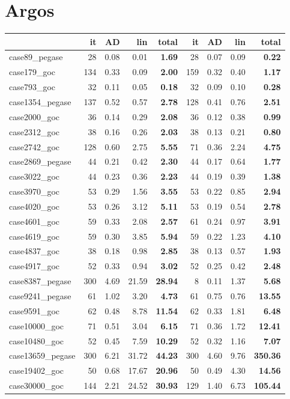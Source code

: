 
\section{Argos}

\begin{tabular}{|l|rrr >{\bfseries}r|rrr >{\bfseries}r|}
\hline
 & it & AD & lin & total & it & AD & lin & total \\
\hline
case89\_pegase & 28 & 0.08 & 0.01 & 1.69 & 28 & 0.07 & 0.09 & 0.22 \\
case179\_goc & 134 & 0.33 & 0.09 & 2.00 & 159 & 0.32 & 0.40 & 1.17 \\
case793\_goc & 32 & 0.11 & 0.05 & 0.18 & 32 & 0.09 & 0.10 & 0.28 \\
case1354\_pegase & 137 & 0.52 & 0.57 & 2.78 & 128 & 0.41 & 0.76 & 2.51 \\
case2000\_goc & 36 & 0.14 & 0.29 & 2.08 & 36 & 0.12 & 0.38 & 0.99 \\
case2312\_goc & 38 & 0.16 & 0.26 & 2.03 & 38 & 0.13 & 0.21 & 0.80 \\
case2742\_goc & 128 & 0.60 & 2.75 & 5.55 & 71 & 0.36 & 2.24 & 4.75 \\
case2869\_pegase & 44 & 0.21 & 0.42 & 2.30 & 44 & 0.17 & 0.64 & 1.77 \\
case3022\_goc & 44 & 0.23 & 0.36 & 2.23 & 44 & 0.19 & 0.39 & 1.38 \\
case3970\_goc & 53 & 0.29 & 1.56 & 3.55 & 53 & 0.22 & 0.85 & 2.94 \\
case4020\_goc & 53 & 0.26 & 3.12 & 5.11 & 53 & 0.19 & 0.54 & 2.78 \\
case4601\_goc & 59 & 0.33 & 2.08 & 2.57 & 61 & 0.24 & 0.97 & 3.91 \\
case4619\_goc & 59 & 0.30 & 3.85 & 5.94 & 59 & 0.22 & 1.23 & 4.10 \\
case4837\_goc & 38 & 0.18 & 0.98 & 2.85 & 38 & 0.13 & 0.57 & 1.93 \\
case4917\_goc & 52 & 0.33 & 0.94 & 3.02 & 52 & 0.25 & 0.42 & 2.48 \\
case8387\_pegase & 300 & 4.69 & 21.59 & 28.94 & 8 & 0.11 & 1.37 & 5.68 \\
case9241\_pegase & 61 & 1.02 & 3.20 & 4.73 & 61 & 0.75 & 0.76 & 13.55 \\
case9591\_goc & 62 & 0.48 & 8.78 & 11.54 & 62 & 0.33 & 1.81 & 6.48 \\
case10000\_goc & 71 & 0.51 & 3.04 & 6.15 & 71 & 0.36 & 1.72 & 12.41 \\
case10480\_goc & 52 & 0.45 & 7.59 & 10.29 & 52 & 0.32 & 1.16 & 7.07 \\
case13659\_pegase & 300 & 6.21 & 31.72 & 44.23 & 300 & 4.60 & 9.76 & 350.36 \\
case19402\_goc & 50 & 0.68 & 17.67 & 20.96 & 50 & 0.49 & 4.30 & 14.56 \\
case30000\_goc & 144 & 2.21 & 24.52 & 30.93 & 129 & 1.40 & 6.73 & 105.44 \\
\hline
\end{tabular}

